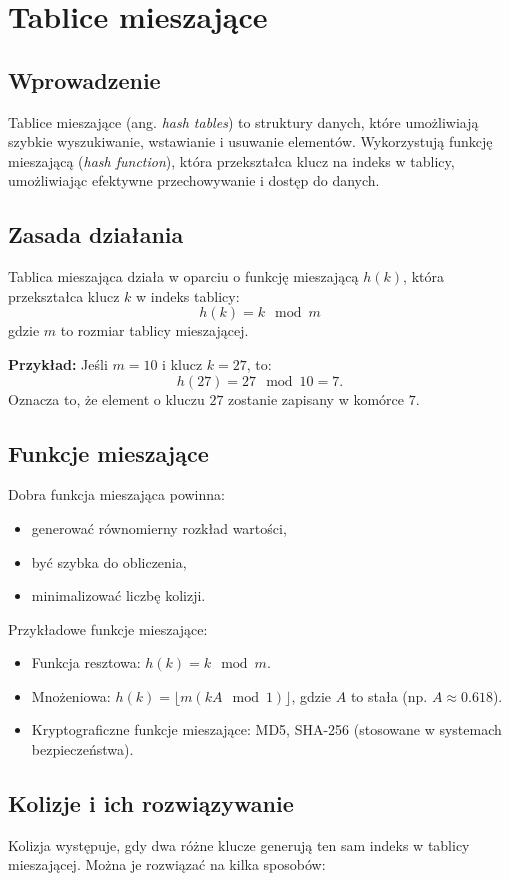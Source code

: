 \section{Tablice mieszające}

\subsection{Wprowadzenie}
Tablice mieszające (ang. \textit{hash tables}) to struktury danych, które umożliwiają szybkie wyszukiwanie, wstawianie i usuwanie elementów. Wykorzystują funkcję mieszającą (\textit{hash function}), która przekształca klucz na indeks w tablicy, umożliwiając efektywne przechowywanie i dostęp do danych.

\subsection{Zasada działania}
Tablica mieszająca działa w oparciu o funkcję mieszającą \( h(k) \), która przekształca klucz \( k \) w indeks tablicy:
\[
h(k) = k \mod m
\]
gdzie \( m \) to rozmiar tablicy mieszającej.

\textbf{Przykład:} Jeśli \( m = 10 \) i klucz \( k = 27 \), to:
\[
h(27) = 27 \mod 10 = 7.
\]
Oznacza to, że element o kluczu \( 27 \) zostanie zapisany w komórce \( 7 \).

\subsection{Funkcje mieszające}
Dobra funkcja mieszająca powinna:
\begin{itemize}
    \item generować równomierny rozkład wartości,
    \item być szybka do obliczenia,
    \item minimalizować liczbę kolizji.
\end{itemize}

Przykładowe funkcje mieszające:
\begin{itemize}
    \item Funkcja resztowa: \( h(k) = k \mod m \).
    \item Mnożeniowa: \( h(k) = \lfloor m (k A \mod 1) \rfloor \), gdzie \( A \) to stała (np. \( A \approx 0.618 \)).
    \item Kryptograficzne funkcje mieszające: MD5, SHA-256 (stosowane w systemach bezpieczeństwa).
\end{itemize}

\subsection{Kolizje i ich rozwiązywanie}
Kolizja występuje, gdy dwa różne klucze generują ten sam indeks w tablicy mieszającej. Można je rozwiązać na kilka sposobów:

